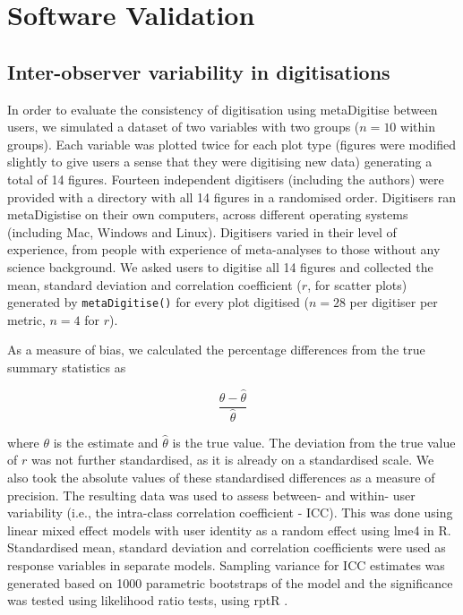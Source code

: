 \documentclass[12pt]{article}
\newcommand{\fct}[1]{\texttt{#1()}}
\newcommand{\pkg}[1]{{\fontseries{b}\selectfont #1}}
\let\proglang=\textsf
\begin{document}
\section{Software Validation}

\subsection{Inter-observer variability in digitisations}

In order to evaluate the consistency of digitisation using \pkg{metaDigitise} between users, we simulated a dataset of two variables with two groups ($n=10$ within groups). Each variable was plotted twice for each plot type (figures were modified slightly to give users a sense that they were digitising new data) generating a total of 14 figures. Fourteen independent digitisers (including the authors) were provided with a directory with all 14 figures in a randomised order. Digitisers ran \pkg{metaDigistise} on their own computers, across different operating systems (including Mac, Windows and Linux). Digitisers varied in their level of experience, from people with experience of meta-analyses to those without any science background. We asked users to digitise all 14 figures and collected the mean, standard deviation and correlation coefficient ($r$, for scatter plots) generated by \fct{metaDigitise} for every plot digitised ($n=28$ per digitiser per metric, $n=4$ for $r$). 

As a measure of bias, we calculated the percentage differences from the true summary statistics as

\begin{equation}
\frac{\theta - \hat{\theta}}{\hat{\theta}}
\end{equation}

where $\theta$ is the estimate and $\hat{\theta}$ is the true value. The deviation from the true value of $r$ was not further standardised, as it is already on a standardised scale. We also took the absolute values of these standardised differences as a measure of precision. The resulting data was used to assess between- and within- user variability (i.e., the intra-class correlation coefficient - ICC). This was done using linear mixed effect models with user identity as a random effect using \pkg{lme4} \citep{bates2015} in \proglang{R}. Standardised mean, standard deviation and correlation coefficients were used as response variables in separate models. Sampling variance for ICC estimates was generated based on 1000 parametric bootstraps of the model and the significance was tested using likelihood ratio tests, using \pkg{rptR} \citep{stoffel2017}.  
\end{document}
